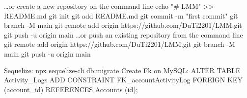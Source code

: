 …or create a new repository on the command line
echo "# LMM" >> README.md
git init
git add README.md
git commit -m "first commit"
git branch -M main
git remote add origin https://github.com/DuTi2201/LMM.git
git push -u origin main
…or push an existing repository from the command line
git remote add origin https://github.com/DuTi2201/LMM.git
git branch -M main
git push -u origin main



Sequelize: npx sequelize-cli db:migrate
Create Fk on MySQL: ALTER TABLE Activity_Logs ADD CONSTRAINT FK_accountActivityLog FOREIGN KEY (account_id) REFERENCES Accounts (id);